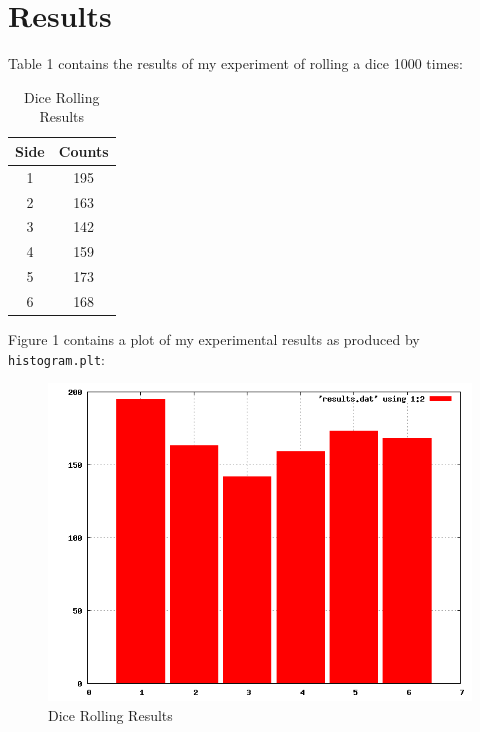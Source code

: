 \documentclass[letterpaper]{article}
\begin{document}

\section*{Results}

Table 1 contains the results of my experiment of rolling a dice 1000 times:

\begin{table}[h!]
	\centering
	\begin{tabular}{c|c}
	Side & Counts\\
	\hline
	1 & 195\\
	2 & 163\\
	3 & 142\\
	4 & 159\\
	5 & 173\\
	6 & 168\\
	\end{tabular}
	\caption{Dice Rolling Results}
	\label{tbl:results}
\end{table}

Figure 1 contains a plot of my experimental results as produced by \texttt{histogram.plt}:

\begin{figure}[h!]
	\centering
	\includegraphics[width=5in]{results.png}
	\caption{Dice Rolling Results}
	\label{fig:results}
\end{figure}
\end{document}
